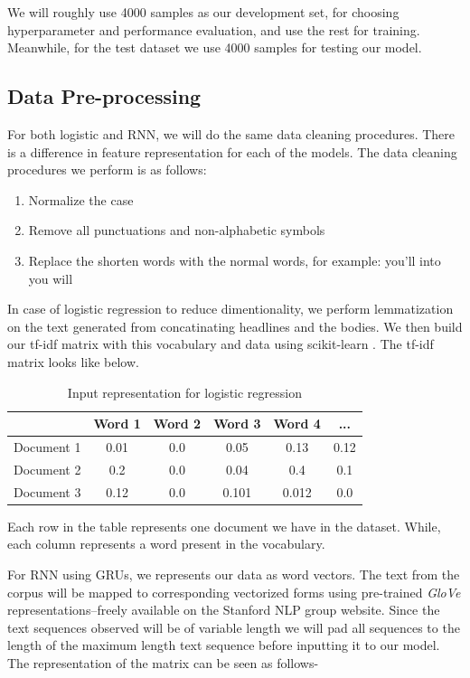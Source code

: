 \documentclass[11.5pt]{article}
\begin{document}
We will roughly use 4000 samples as our development set, for choosing 
hyperparameter and performance evaluation, and use the rest for training. Meanwhile, for the test dataset we use 4000 samples for testing our model.

\subsection{Data Pre-processing}

For both logistic and RNN, we will do the same data cleaning procedures. There is a difference in feature representation for each of the models.
The data cleaning procedures we perform is as follows:

\begin{enumerate}
  \item Normalize the case
  \item Remove all punctuations and non-alphabetic symbols 
  \item Replace the shorten words with the normal words, for example: you'll into you will
\end{enumerate}

 
In case of logistic regression to reduce dimentionality, we perform lemmatization on the text generated from concatinating headlines and the bodies. 
We then build our tf-idf matrix with this vocabulary and data using scikit-learn \cite{scikit-learn}. The tf-idf matrix looks like below.

\begin{table}[h]
  \centering
  \begin{tabular} 
    {|c|c|c|c|c|c|}
    \hline
    & Word 1 & Word 2 & Word 3 & Word 4 & ... \\
    \hline
    Document 1 & 0.01 & 0.0 & 0.05 & 0.13 & 0.12 \\
    \hline
    Document 2 & 0.2 & 0.0 & 0.04 & 0.4 & 0.1 \\
    \hline
    Document 3  & 0.12 & 0.0 & 0.101 & 0.012 & 0.0 \\
    \hline
  \end{tabular}
  \caption{Input representation for logistic regression}
\end{table}

Each row in the table represents one document we have in the dataset. While, each column represents a word present in the vocabulary.

For RNN using GRUs, we represents our data as word vectors. The text from the corpus will be mapped to corresponding vectorized
forms using  pre-trained \textit{GloVe} 
representations--freely available on the Stanford NLP group website\cite{Bird:2009:NLP:1717171,pennington2014glove}. 
Since the text sequences observed will be of variable length we will pad all 
sequences to the length of the maximum length text sequence before inputting 
it to our model. The representation of the matrix can be seen as follows-
\end{document}
